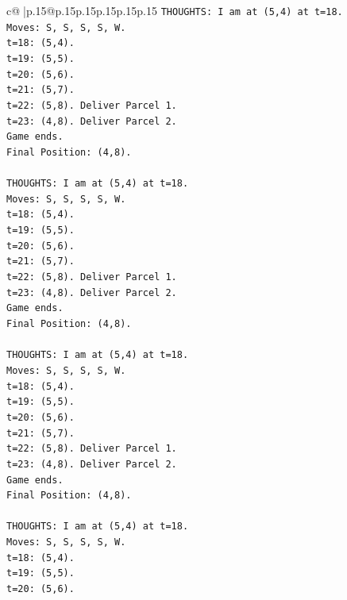 \documentclass{article}
\begin{document}
{\begin{supertabular}{c@{$\;$}|p{.15\linewidth}@{}p{.15\linewidth}p{.15\linewidth}p{.15\linewidth}p{.15\linewidth}p{.15\linewidth}}
{{{\texttt{THOUGHTS: I am at (5,4) at t=18.} \\
\texttt{Moves: S, S, S, S, W.} \\
\texttt{t=18: (5,4).} \\
\texttt{t=19: (5,5).} \\
\texttt{t=20: (5,6).} \\
\texttt{t=21: (5,7).} \\
\texttt{t=22: (5,8). Deliver Parcel 1.} \\
\texttt{t=23: (4,8). Deliver Parcel 2.} \\
\texttt{Game ends.} \\
\texttt{Final Position: (4,8).} \\
\\ 
\texttt{THOUGHTS: I am at (5,4) at t=18.} \\
\texttt{Moves: S, S, S, S, W.} \\
\texttt{t=18: (5,4).} \\
\texttt{t=19: (5,5).} \\
\texttt{t=20: (5,6).} \\
\texttt{t=21: (5,7).} \\
\texttt{t=22: (5,8). Deliver Parcel 1.} \\
\texttt{t=23: (4,8). Deliver Parcel 2.} \\
\texttt{Game ends.} \\
\texttt{Final Position: (4,8).} \\
\\ 
\texttt{THOUGHTS: I am at (5,4) at t=18.} \\
\texttt{Moves: S, S, S, S, W.} \\
\texttt{t=18: (5,4).} \\
\texttt{t=19: (5,5).} \\
\texttt{t=20: (5,6).} \\
\texttt{t=21: (5,7).} \\
\texttt{t=22: (5,8). Deliver Parcel 1.} \\
\texttt{t=23: (4,8). Deliver Parcel 2.} \\
\texttt{Game ends.} \\
\texttt{Final Position: (4,8).} \\
\\ 
\texttt{THOUGHTS: I am at (5,4) at t=18.} \\
\texttt{Moves: S, S, S, S, W.} \\
\texttt{t=18: (5,4).} \\
\texttt{t=19: (5,5).} \\
\texttt{t=20: (5,6).} \\
}}}
\end{supertabular}}
\end{document}
